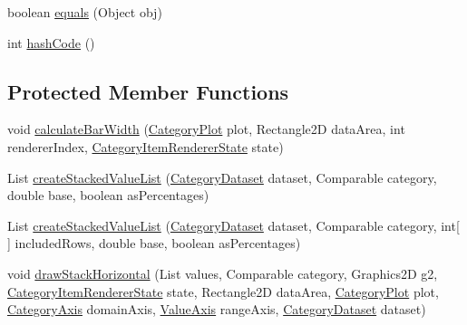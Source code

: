 \begin{DoxyCompactItemize}
\item 
boolean \mbox{\hyperlink{classorg_1_1jfree_1_1chart_1_1renderer_1_1category_1_1_stacked_bar_renderer3_d_a95b0bc0837057a916700857d5944434f}{equals}} (Object obj)
\item 
int \mbox{\hyperlink{classorg_1_1jfree_1_1chart_1_1renderer_1_1category_1_1_stacked_bar_renderer3_d_a688d8d884f8ace9f9b7489625dffe106}{hash\+Code}} ()
\end{DoxyCompactItemize}
\subsection*{Protected Member Functions}
\begin{DoxyCompactItemize}
\item 
void \mbox{\hyperlink{classorg_1_1jfree_1_1chart_1_1renderer_1_1category_1_1_stacked_bar_renderer3_d_a70ff6a3d18c2a93e26e8277be3ab5210}{calculate\+Bar\+Width}} (\mbox{\hyperlink{classorg_1_1jfree_1_1chart_1_1plot_1_1_category_plot}{Category\+Plot}} plot, Rectangle2D data\+Area, int renderer\+Index, \mbox{\hyperlink{classorg_1_1jfree_1_1chart_1_1renderer_1_1category_1_1_category_item_renderer_state}{Category\+Item\+Renderer\+State}} state)
\item 
List \mbox{\hyperlink{classorg_1_1jfree_1_1chart_1_1renderer_1_1category_1_1_stacked_bar_renderer3_d_a2edeabfcab8fb7e8b28b0ab28538c0f0}{create\+Stacked\+Value\+List}} (\mbox{\hyperlink{interfaceorg_1_1jfree_1_1data_1_1category_1_1_category_dataset}{Category\+Dataset}} dataset, Comparable category, double base, boolean as\+Percentages)
\item 
List \mbox{\hyperlink{classorg_1_1jfree_1_1chart_1_1renderer_1_1category_1_1_stacked_bar_renderer3_d_aace6dbe0c16242bfca8f7f874cf5ed6e}{create\+Stacked\+Value\+List}} (\mbox{\hyperlink{interfaceorg_1_1jfree_1_1data_1_1category_1_1_category_dataset}{Category\+Dataset}} dataset, Comparable category, int\mbox{[}$\,$\mbox{]} included\+Rows, double base, boolean as\+Percentages)
\item 
void \mbox{\hyperlink{classorg_1_1jfree_1_1chart_1_1renderer_1_1category_1_1_stacked_bar_renderer3_d_a558fec6208dab132d71e51ab0ef6daa8}{draw\+Stack\+Horizontal}} (List values, Comparable category, Graphics2D g2, \mbox{\hyperlink{classorg_1_1jfree_1_1chart_1_1renderer_1_1category_1_1_category_item_renderer_state}{Category\+Item\+Renderer\+State}} state, Rectangle2D data\+Area, \mbox{\hyperlink{classorg_1_1jfree_1_1chart_1_1plot_1_1_category_plot}{Category\+Plot}} plot, \mbox{\hyperlink{classorg_1_1jfree_1_1chart_1_1axis_1_1_category_axis}{Category\+Axis}} domain\+Axis, \mbox{\hyperlink{classorg_1_1jfree_1_1chart_1_1axis_1_1_value_axis}{Value\+Axis}} range\+Axis, \mbox{\hyperlink{interfaceorg_1_1jfree_1_1data_1_1category_1_1_category_dataset}{Category\+Dataset}} dataset)

\end{DoxyCompactItemize}
